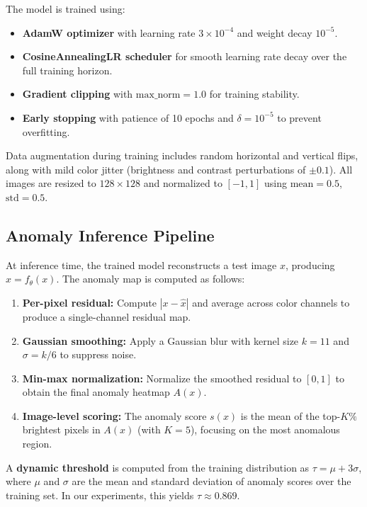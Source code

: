 \documentclass{article}
\begin{document}
The model is trained using:
\begin{itemize}
    \item \textbf{AdamW optimizer} with learning rate $3 \times 10^{-4}$ and weight decay $10^{-5}$.
    \item \textbf{CosineAnnealingLR scheduler} for smooth learning rate decay over the full training horizon.
    \item \textbf{Gradient clipping} with $\text{max\_norm} = 1.0$ for training stability.
    \item \textbf{Early stopping} with patience of 10 epochs and $\delta = 10^{-5}$ to prevent overfitting.
\end{itemize}

Data augmentation during training includes random horizontal and vertical flips, along with mild color jitter (brightness and contrast perturbations of $\pm 0.1$). All images are resized to $128 \times 128$ and normalized to $[-1, 1]$ using $\text{mean} = 0.5$, $\text{std} = 0.5$.

\subsection{Anomaly Inference Pipeline}

At inference time, the trained model reconstructs a test image $x$, producing $\hat{x} = f_\theta(x)$. The anomaly map is computed as follows:

\begin{enumerate}
    \item \textbf{Per-pixel residual:} Compute $|x - \hat{x}|$ and average across color channels to produce a single-channel residual map.
    \item \textbf{Gaussian smoothing:} Apply a Gaussian blur with kernel size $k = 11$ and $\sigma = k/6$ to suppress noise.
    \item \textbf{Min-max normalization:} Normalize the smoothed residual to $[0, 1]$ to obtain the final anomaly heatmap $A(x)$.
    \item \textbf{Image-level scoring:} The anomaly score $s(x)$ is the mean of the top-$K\%$ brightest pixels in $A(x)$ (with $K = 5$), focusing on the most anomalous region.
\end{enumerate}

A \textbf{dynamic threshold} is computed from the training distribution as $\tau = \mu + 3\sigma$, where $\mu$ and $\sigma$ are the mean and standard deviation of anomaly scores over the training set. In our experiments, this yields $\tau \approx 0.869$.
\end{document}
